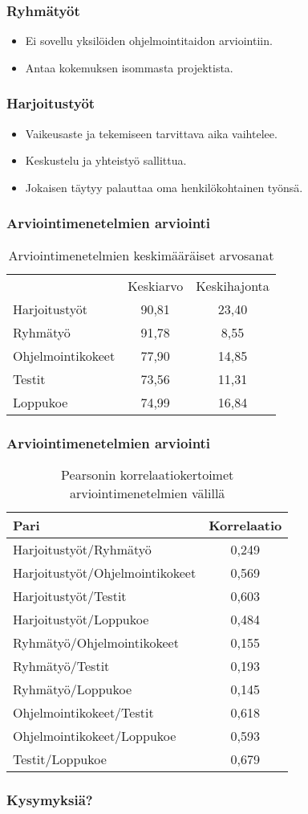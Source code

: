 \documentclass[finnish]{beamer}
\begin{document}
\frame
{
  \frametitle{Ryhmätyöt}
  \begin{itemize}
    \item Ei sovellu yksilöiden ohjelmointitaidon arviointiin.
    \item Antaa kokemuksen isommasta projektista.
  \end{itemize}
}

\frame
{
  \frametitle{Harjoitustyöt}
  \begin{itemize}
    \item Vaikeusaste ja tekemiseen tarvittava aika vaihtelee.
    \item Keskustelu ja yhteistyö sallittua.
    \item Jokaisen täytyy palauttaa oma henkilökohtainen työnsä.
  \end{itemize}
}

\frame
{
  \frametitle{Arviointimenetelmien arviointi}
  \begin{table}
    \begin{tabular}{ l | c c }
       & Keskiarvo & Keskihajonta \\
      Harjoitustyöt & 90,81 & 23,40 \\
      Ryhmätyö & 91,78 & 8,55 \\
      Ohjelmointikokeet & 77,90 & 14,85 \\
      Testit & 73,56 & 11,31 \\
      Loppukoe & 74,99 & 16,84 \\
    \end{tabular}
  \caption{Arviointimenetelmien keskimääräiset arvosanat}
  \label{tab:arviointimenetelmat}
  \end{table}
}

\frame
{
  \frametitle{Arviointimenetelmien arviointi}
  \begin{table}
    \begin{tabular}{ l c }
      Pari & Korrelaatio \\
      \hline
      Harjoitustyöt/Ryhmätyö & 0,249 \\
      Harjoitustyöt/Ohjelmointikokeet & 0,569 \\
      Harjoitustyöt/Testit & 0,603 \\
      Harjoitustyöt/Loppukoe & 0,484 \\
      Ryhmätyö/Ohjelmointikokeet & 0,155 \\
      Ryhmätyö/Testit & 0,193 \\
      Ryhmätyö/Loppukoe & 0,145 \\
      Ohjelmointikokeet/Testit & 0,618 \\
      Ohjelmointikokeet/Loppukoe & 0,593 \\
      Testit/Loppukoe & 0,679 \\
    \end{tabular}
  \caption{Pearsonin korrelaatiokertoimet arviointimenetelmien välillä}
  \label{tab:korrelaatiot}
  \end{table}
}

\frame
{
  \frametitle{Kysymyksiä?}
}
\end{document}

